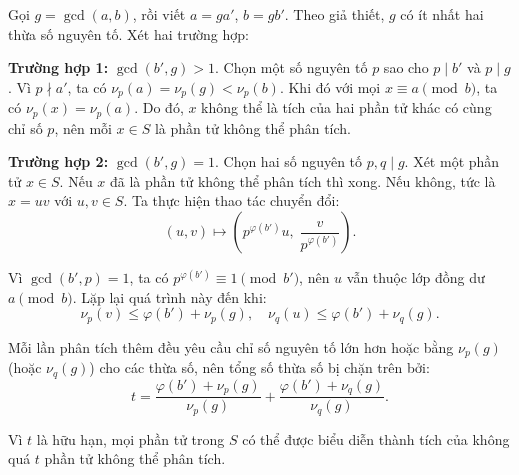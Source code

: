 \documentclass[../06-largest-exponent.tex]{subfiles}
\begin{document}
\begin{soln}\footnotemark
	Gọi \( g = \gcd(a,b) \), rồi viết \( a = ga' \), \( b = gb' \). Theo giả thiết, \(g\) có ít nhất hai thừa số nguyên tố. Xét hai trường hợp:

	\textbf{Trường hợp 1:} \(\gcd(b',g) > 1\).  
	Chọn một số nguyên tố \(p\) sao cho \(p \mid b'\) và \(p \mid g\). Vì \(p \nmid a'\), ta có \(\nu_p(a) = \nu_p(g) < \nu_p(b)\). Khi đó với mọi \(x \equiv a \pmod{b}\), ta có \(\nu_p(x) = \nu_p(a)\). Do đó, \(x\) không thể là tích của hai phần tử khác có cùng chỉ số \(p\), nên mỗi \(x \in S\) là phần tử không thể phân tích.

	\textbf{Trường hợp 2:} \(\gcd(b', g) = 1\).  
	Chọn hai số nguyên tố \(p, q \mid g\). Xét một phần tử \(x \in S\). Nếu \(x\) đã là phần tử không thể phân tích thì xong. Nếu không, tức là \(x = uv\) với \(u, v \in S\). Ta thực hiện thao tác chuyển đổi:
	\[
		(u, v) \mapsto \left( p^{\varphi(b')} u,\; \frac{v}{p^{\varphi(b')}} \right).
	\]

	Vì \(\gcd(b', p) = 1\), ta có \(p^{\varphi(b')} \equiv 1 \pmod{b'}\), nên \(u\) vẫn thuộc lớp đồng dư \(a \pmod{b}\). Lặp lại quá trình này đến khi:
	\[
		\nu_p(v) \le \varphi(b') + \nu_p(g),\quad
		\nu_q(u) \le \varphi(b') + \nu_q(g).
	\]

	Mỗi lần phân tích thêm đều yêu cầu chỉ số nguyên tố lớn hơn hoặc bằng \(\nu_p(g)\) (hoặc \(\nu_q(g)\)) cho các thừa số, nên tổng số thừa số bị chặn trên bởi:
	\[
		t = \frac{\varphi(b') + \nu_p(g)}{\nu_p(g)} + \frac{\varphi(b') + \nu_q(g)}{\nu_q(g)}.
	\]

	Vì \(t\) là hữu hạn, mọi phần tử trong \(S\) có thể được biểu diễn thành tích của không quá \(t\) phần tử không thể phân tích.
\end{soln}

\end{document}
